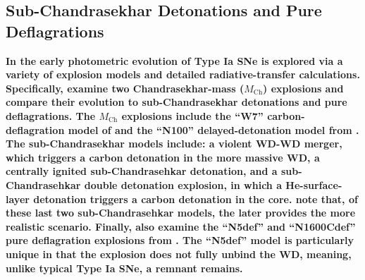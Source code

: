 \documentclass[twocolumn]{aastex61}
\begin{document}
\subsection{\textbf{Sub-Chandrasekhar Detonations and Pure Deflagrations}}

\textbf{In \citet{2017MNRAS.472.2787N} the early photometric evolution of Type
Ia SNe is explored via a variety of explosion models and detailed
radiative-transfer calculations. Specifically, \citet{2017MNRAS.472.2787N}
examine two Chandrasekhar-mass ($M_\mathrm{Ch}$) explosions and compare their
evolution to sub-Chandrasekhar detonations and pure deflagrations. The
$M_\mathrm{Ch}$ explosions include the ``W7'' carbon-deflagration model of
\citet{1984ApJ...286..644N} and the ``N100'' delayed-detonation model from
\citet{2013MNRAS.429.1156S}. The sub-Chandrasekhar models include: a violent
WD-WD merger, which triggers a carbon detonation in the more massive WD, a
centrally ignited sub-Chandrasehkar detonation, and a sub-Chandrasehkar double
detonation explosion, in which a He-surface-layer detonation triggers a carbon
detonation in the core. \citet{2017MNRAS.472.2787N} note that, of these last
two sub-Chandrasehkar models, the later provides the more realistic scenario.
Finally, \citeauthor{2017MNRAS.472.2787N} also examine the ``N5def'' and
``N1600Cdef'' pure deflagration explosions from \citet{2014MNRAS.438.1762F}.
The ``N5def'' model is particularly unique in that the explosion does not
fully unbind the WD, meaning, unlike typical Type Ia SNe, a remnant remains.}
\end{document}
